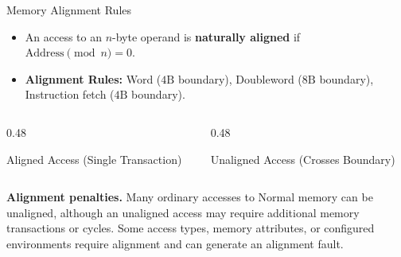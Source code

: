 \documentclass[aspectratio=169,11pt,t,xcolor=table]{beamer}
\newcommand{\key}[1]{\textbf{#1}}
\begin{document}
\begin{frame}{Memory Alignment Rules}
\vfill
\begin{itemize}\setlength{\itemsep}{3pt}
  \item An access to an $n$-byte operand is \key{naturally aligned} if $\text{Address} \pmod n = 0$.
  \item \textbf{Alignment Rules:} Word ($4\text{B}$ boundary), Doubleword ($8\text{B}$ boundary), Instruction fetch ($4\text{B}$ boundary).
\end{itemize}

\vfill
\begin{columns}[T]
\begin{column}{0.48\textwidth}
\begin{block}{Aligned Access (Single Transaction)}
\centering
\vspace{0.05cm}
\end{block}
\end{column}

\begin{column}{0.48\textwidth}
\begin{block}{Unaligned Access (Crosses Boundary)}
\centering
\vspace{0.05cm}
\end{block}
\end{column}
\end{columns}

\vfill
\small
\textbf{Alignment penalties.} Many ordinary accesses to Normal memory can be unaligned, although an unaligned access may require additional memory transactions or cycles. Some access types, memory attributes, or configured environments require alignment and can generate an alignment fault.
\vfill
\end{frame}
\end{document}
